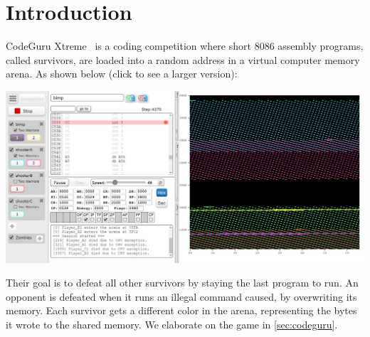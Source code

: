 \documentclass[dvipsnames, format=sigconf]{acmart}
\begin{document}
\maketitle

\section{Introduction}
CodeGuru Xtreme~\cite{codeguru_repo} is a coding competition where short 8086 assembly programs, called survivors, are loaded into a random address in a virtual computer memory arena. As shown below (click to see a larger version):

\begin{center}
\href{https://bit.ly/codeguru_fig1}{\includegraphics[width=\linewidth]{images/memory_use.jpg}}
\end{center}

Their goal is to defeat all other survivors by staying the last program to run. An opponent is defeated when it runs an illegal command caused, \eg by overwriting its memory. %
Each survivor gets a different color in the arena, representing the bytes it wrote to the shared memory. We elaborate on the game in \autoref{sec:codeguru}.


\end{document}
